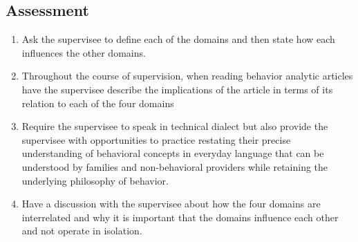\subsection{Assessment}
\begin{enumerate}
\item Ask the supervisee to define each of the domains and then state how each influences the other domains. 
\item Throughout the course of supervision, when reading behavior analytic articles have the supervisee describe the implications of the article in terms of its relation to each of the four domains 
\item Require the supervisee to speak in technical dialect but also provide the supervisee with opportunities to practice restating their precise understanding of behavioral concepts in everyday language that can be understood by families and non-behavioral providers while retaining the underlying philosophy of behavior. 
\item Have a discussion with the supervisee about how the four domains are interrelated and why it is important that the domains influence each other and not operate in isolation.  
\end{enumerate}
%
